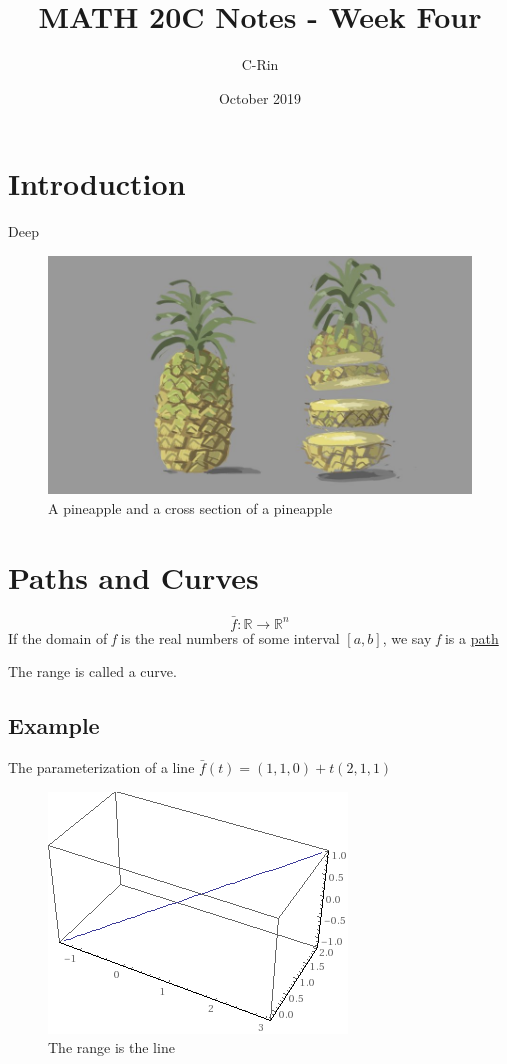 \documentclass{article}
\title{MATH 20C Notes - Week Four}
\author{C-Rin}
\date{October 2019}
\begin{document}
\maketitle

\section*{Introduction}
Deep 

\begin{figure}[h!]
\centering
\includegraphics[scale=0.25]{pineapple.jpg}
\caption{A pineapple and a cross section of a pineapple}
\end{figure}


\newpage
\section{Paths and Curves}
\[\bar{f}:\mathbb{R} \rightarrow\mathbb{R}^n\]
If the domain of \textit{f} is the real numbers of some interval $[a,b]$, we say \textit{f} is a \underline{path}

The range is called a curve.

\subsection*{Example}
The parameterization of a line $\bar{f}(t)=(1,1,0)+t(2,1,1)$
\begin{figure}[h!]
    \centering
    \includegraphics[scale=0.5]{images/parametric.png}
    \caption{The range is the line}
    \label{}
\end{figure}
\end{document}
